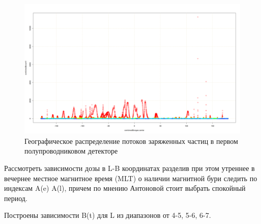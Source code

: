 \begin{figure}[h]
	\includegraphics[width=0.8\linewidth]{images/Flash/depron_lat_map_148}
	\caption{Географическое распределение потоков заряженных частиц в первом полупроводниковом детекторе}
	\label{fig:depronlatmap148}
\end{figure}
Рассмотреть зависимости дозы в L-B координатах разделив при этом утреннее в вечернее местное магнитное время (MLT) о наличии магнитной бури следить по индексам A(e) A(l), причем по мнению Антоновой стоит выбрать спокойный период.

Построены зависимости B(t) для L из диапазонов от 4-5, 5-6, 6-7.


